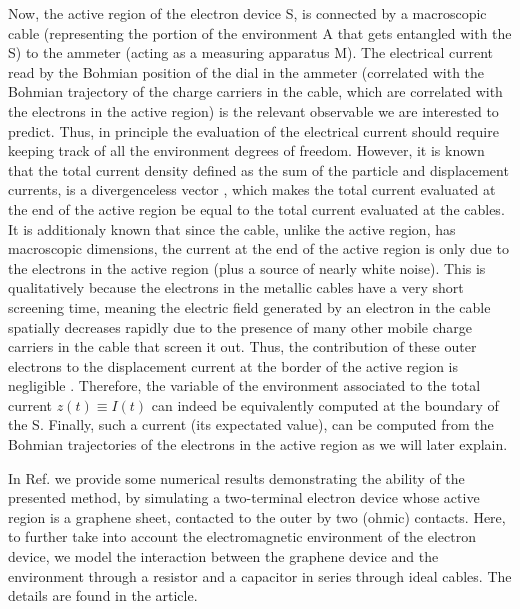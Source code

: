 \documentclass[11pt, a4paper]{article} %
\begin{document}
Now, the active region of the electron device S, is connected by a macroscopic cable (representing the portion of the environment A that gets entangled with the S) to the ammeter (acting as a measuring apparatus M). The electrical current read by the Bohmian position of the dial in the ammeter (correlated with the Bohmian trajectory of the charge carriers in the cable, which are correlated with the electrons in the active region) is the relevant observable we are interested to predict. Thus, in principle the evaluation of the electrical current should require keeping track of all the environment degrees of freedom. However, it is known that the total current density defined as the sum of the particle and displacement currents, is a divergenceless vector \cite{diver1, diver2}, which makes the total current evaluated at the end of the active region be equal to the total current evaluated at the cables. It is additionaly known \cite{equiv} that since the cable, unlike the active region, has macroscopic dimensions, the current at the end of the active region is only due to the electrons in the active region (plus a source of nearly white noise). This is qualitatively because the electrons in the metallic cables have a very short screening time, meaning the electric field generated by an electron in the cable spatially decreases rapidly due to the presence of many other mobile charge carriers in the cable that screen it out. Thus, the contribution of these outer electrons to the displacement current at the border of the active region is negligible \cite{neg}. Therefore, the variable of the environment associated to the total current $z(t)\equiv I(t)$ can indeed be equivalently computed at the boundary of the S. Finally, such a current (its expectated value), can be computed from the Bohmian trajectories of the electrons in the active region as we will later explain. 

In Ref. \cite{Thz} we provide some numerical results demonstrating the ability of the presented method, by simulating a two-terminal electron device whose active region is a graphene sheet, contacted to the outer by two (ohmic) contacts. Here, to further take into account the electromagnetic environment of the electron device, we model the interaction between the graphene device and the environment through a resistor and a capacitor in series through ideal cables. The details are found in the article. 
\end{document}
